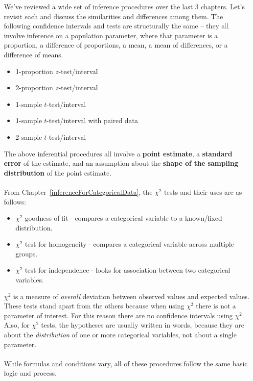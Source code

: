\noindent We've reviewed a wide set of inference procedures over the last 3 chapters. Let's revisit each and discuss the similarities and differences among them.  The following confidence intervals and tests are structurally the same -- they all involve inference on a population parameter, where that parameter is a proportion, a difference of proportions, a mean, a mean of differences, or a difference of means. \vspace{-1mm}
\begin{itemize}
\setlength{\itemsep}{0mm}
\item 1-proportion $z$-test/interval
\item 2-proportion $z$-test/interval
\item 1-sample $t$-test/interval
\item 1-sample $t$-test/interval with paired data
\item 2-sample $t$-test/interval 
\end{itemize}
The above inferential procedures all involve a \textbf{point estimate}, a \textbf{standard error} of the estimate, and an assumption about the \textbf{shape of the sampling distribution} of the point estimate.
\\ 
\\ 
From Chapter~\ref{inferenceForCategoricalData}, the $\chi^2$ tests and their uses are as follows:\vspace{-1mm}
\begin{itemize}
\setlength{\itemsep}{0mm}
\item $\chi^2$ goodness of fit - compares a categorical variable to a known/fixed distribution.
\item $\chi^2$ test for homogeneity - compares a categorical variable across multiple groups.
\item $\chi^2$ test for independence - looks for association between two categorical variables. 
\end{itemize}
$\chi^2$ is a measure of \emph{overall} deviation between observed values and expected values.  These tests stand apart from the others because when using $\chi^2$ there is not a parameter of interest.  For this reason there are no confidence intervals using $\chi^2$.  Also, for $\chi^2$ tests, the hypotheses are usually written in words, because they are about the \emph{distribution} of one or more categorical variables, not about a single parameter.  
\\
\\
While formulas and conditions vary, all of these procedures follow the same basic logic and process.

